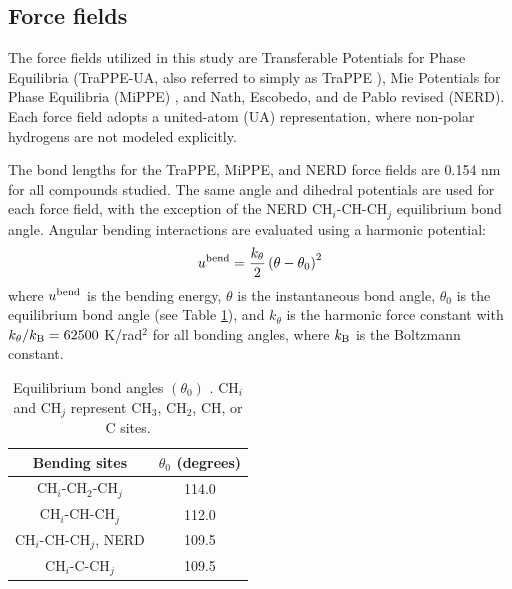 \documentclass[journal=jced,manuscript=article]{achemso}
\begin{document}
\subsection{Force fields} \label{sec: Force fields}

    The force fields utilized in this study are Transferable Potentials for Phase Equilibria (TraPPE-UA, also referred to simply as TraPPE \cite{TraPPE,Martin1999,TraPPEUA2}), Mie Potentials for Phase Equilibria (MiPPE) \cite{Mie,Potoff_branched}, and Nath, Escobedo, and de Pablo revised (NERD). Each force field adopts a united-atom (UA) representation, where non-polar hydrogens are not modeled explicitly. 
    
    
    The bond lengths for the TraPPE, MiPPE, and NERD force fields are 0.154 nm for all compounds studied. The same angle and dihedral potentials are used for each force field, with the exception of the NERD CH$_i$-CH-CH$_j$ equilibrium bond angle. Angular bending interactions are evaluated using a harmonic potential:
    \begin{equation}
    u^{\rm bend} = \frac{k_\theta}{2} \left(\theta-\theta_0\right)^2
    \end{equation}
    where $u^{\rm bend}$ is the bending energy, $\theta$ is the instantaneous bond angle, $\theta_0$ is the equilibrium bond angle (see Table \ref{tab:angles}), and $k_\theta$ is the harmonic force constant with $k_\theta/k_{\rm B} = 62500$ K/rad$^2$ for all bonding angles, where $k_{\rm B}$ is the Boltzmann constant. 
    
    \begin{table}[h!]
    	\caption{Equilibrium bond angles $(\theta_0)$ \cite{Martin1999}. CH$_i$ and CH$_j$ represent CH$_3$, CH$_2$, CH, or C sites.} \label{tab:angles}
    	\begin{center}
    		\begin{tabular}{|c|c|}
    			\hline
    			Bending sites & $\theta_0$ (degrees) \\ \hline
    			CH$_i$-CH$_2$-CH$_j$ & 114.0 \\ 
    			CH$_i$-CH-CH$_j$ & 112.0 \\
    			CH$_i$-CH-CH$_j$, NERD & 109.5 \\ 
    			CH$_i$-C-CH$_j$ & 109.5 \\
    			\hline
    		\end{tabular}
    	\end{center} 
    \end{table}
    
\end{document}
